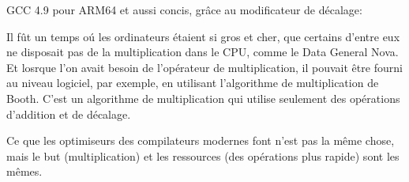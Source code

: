 









GCC 4.9 pour ARM64 et aussi concis, grâce au modificateur de décalage:




Il fût un temps oú les ordinateurs étaient si gros et cher, que certains d'entre
eux ne disposait pas de la multiplication dans le \ac{CPU}, comme le Data General Nova.
Et losrque l'on avait besoin de l'opérateur de multiplication, il pouvait être fourni
au niveau logiciel, par exemple, en utilisant l'algorithme de multiplication de Booth.
C'est un algorithme de multiplication qui utilise seulement des opérations d'addition
et de décalage.

Ce que les optimiseurs des compilateurs modernes font n'est pas la même chose, mais
le but (multiplication) et les ressources (des opérations plus rapide) sont les mêmes.
